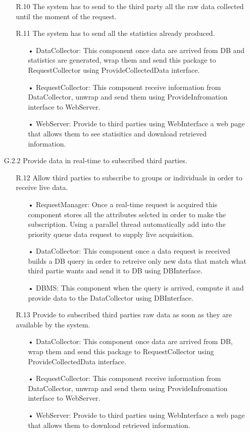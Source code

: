 \begin{enumerate}
\begin{enumerate}
	\item [R.10] The system has to send to the third party all the raw data collected until the moment of the request.
	\item [R.11] The system has to send all the statistics already produced.
		\begin{enumerate}
		\item[•] DataCollector: This component once data are arrived from DB and statistics are generated, wrap them and send this package to RequestCollector using ProvideCollectedData interface.
		\item[•] RequestCollector: This component receive information from DataCollector, unwrap and send them using ProvideInfromation interface to WebServer.
		\item[•] WebServer: Provide to third parties using WebInterface a web page that allows them to see statisitics and download retrieved information.
		\end{enumerate}	
	\end{enumerate}

\item [G.2.2] Provide data in real-time to subscribed third parties.
	\begin{enumerate}
	\item [R.12] Allow third parties to subscribe to groups or individuals in order to receive live data.
		\begin{enumerate}
		\item[•] RequestManager: Once a real-time request is acquired this component stores all the attributes selcted in order to make the subscription. Using a parallel thread automatically add into the priority queue data request to supply live acquisition.
		\item[•] DataCollector: This component once a data request is received builds a DB query in order to retreive only new data that match what third partie wants and send it to DB using DBInterface.
		\item[•] DBMS: This component when the query is arrived, compute it and provide data to the DataCollector using DBInterface.
		\end{enumerate}	
			
	\item [R.13] Provide to subscribed third parties raw data as soon as they are available by the system.
		\begin{enumerate}
		\item[•] DataCollector: This component once data are arrived from DB, wrap them and send this package to RequestCollector using ProvideCollectedData interface.
		\item[•] RequestCollector: This component receive information from DataCollector, unwrap and send them using ProvideInfromation interface to WebServer.
		\item[•] WebServer: Provide to third parties using WebInterface a web page that allows them to download retrieved information.
		\end{enumerate}	
	\end{enumerate}
	

\end{enumerate}
